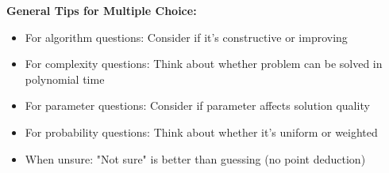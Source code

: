 \textbf{General Tips for Multiple Choice:}
\begin{itemize}
\item For algorithm questions: Consider if it's constructive or improving
\item For complexity questions: Think about whether problem can be solved in polynomial time
\item For parameter questions: Consider if parameter affects solution quality
\item For probability questions: Think about whether it's uniform or weighted
\item When unsure: "Not sure" is better than guessing (no point deduction)
\end{itemize}
